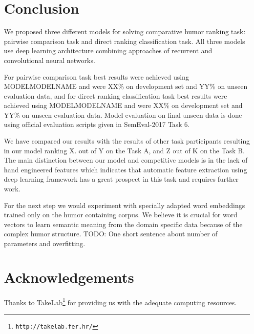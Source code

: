 \documentclass[10pt, a4paper]{article}
\begin{document}




\section{Conclusion}

We proposed three different models for solving comparative humor ranking task: pairwise comparison task and direct ranking classification task. All three models use deep learning architecture combining approaches of recurrent and convolutional neural networks.

For pairwise comparison task best results were achieved using MODELMODELNAME and were XX\% on development set and YY\% on unseen evaluation data, and for direct ranking classification task best results were achieved using MODELMODELNAME and were XX\% on development set and YY\% on unseen evaluation data. Model evaluation on final unseen data is done using official evaluation scripts given in SemEval-2017 Task 6.

We have compared our results with the results of other task participants resulting in our model ranking  X. out of Y on the Task A, and Z out of K on the Task B.  The main distinction between our model and competitive models is in the lack of hand engineered features which indicates that automatic feature extraction using deep learning framework has a great prospect in this task and requires further work.

For the next step we would experiment with specially adapted word embeddings trained only on the humor containing corpus. We believe it is crucial for word vectors to learn semantic meaning from the domain specific data because of the complex humor structure.  TODO: One short sentence about number of parameters and overfitting.

\section*{Acknowledgements}

Thanks to TakeLab\footnote{\texttt{http://takelab.fer.hr/}} for providing us with the adequate computing resources.


 
\end{document}
